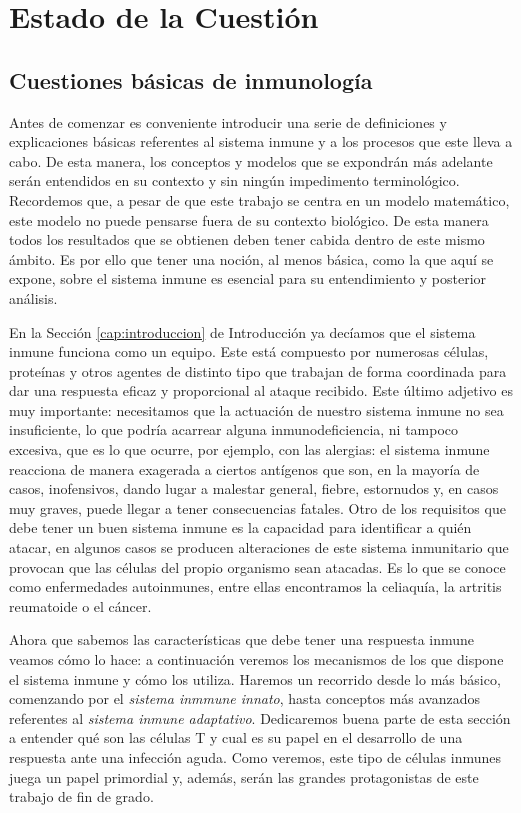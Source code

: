 \chapter{Estado de la Cuestión}
\label{cap:estadoDeLaCuestion}




\section{Cuestiones básicas de inmunología}

Antes de comenzar es conveniente introducir una serie de definiciones y explicaciones básicas referentes al sistema inmune y a los procesos que este lleva a cabo. De esta manera, los conceptos y modelos que se expondrán más adelante serán entendidos en su contexto y sin ningún impedimento terminológico. Recordemos que, a pesar de que este trabajo se centra en un modelo matemático, este  modelo no puede pensarse fuera de su contexto biológico. De esta manera todos los resultados que se obtienen deben tener cabida dentro de este mismo ámbito. Es por ello que tener una noción, al menos básica, como la que aquí se expone, sobre el sistema inmune es esencial para su entendimiento y posterior análisis.

En la Sección \ref{cap:introduccion} de Introducción ya decíamos que el sistema inmune funciona como un equipo. Este está compuesto por numerosas células, proteínas y otros agentes de distinto tipo que trabajan de forma coordinada para dar una respuesta eficaz y proporcional al ataque recibido. Este último adjetivo es muy importante: necesitamos que la actuación de nuestro sistema inmune no sea insuficiente, lo que podría acarrear alguna inmunodeficiencia, ni tampoco excesiva, que es lo que ocurre, por ejemplo, con las alergias: el sistema inmune reacciona de manera exagerada a ciertos antígenos que son, en la mayoría de casos, inofensivos, dando lugar a malestar general, fiebre, estornudos y, en casos muy graves, puede llegar a tener consecuencias fatales. Otro de los requisitos que debe tener un buen sistema inmune es la capacidad para identificar a quién atacar, en algunos casos se producen alteraciones de este sistema inmunitario que provocan que las células del propio organismo sean atacadas. Es lo que se conoce como enfermedades autoinmunes, entre ellas encontramos la celiaquía, la artritis reumatoide o el cáncer.

Ahora que sabemos las características que debe tener una respuesta inmune veamos cómo lo hace: a continuación veremos los mecanismos de los que dispone el sistema inmune y cómo los utiliza. Haremos un recorrido desde lo más básico, comenzando por el \textit{sistema inmmune innato}, hasta conceptos más avanzados referentes al \textit{sistema inmune adaptativo}. Dedicaremos buena parte de esta sección a entender qué son las células T y cual es su papel en el desarrollo de una respuesta ante una infección aguda. Como veremos, este tipo de células inmunes juega un papel primordial y, además, serán las grandes protagonistas de este trabajo de fin de grado.  

